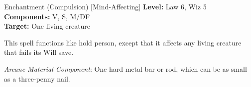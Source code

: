 {Enchantment (Compulsion) [Mind-Affecting]}
{
	\textbf{Level:}
	Law 6, Wiz 5\\
	\textbf{Components:}
	V, S, M/DF\\
	\textbf{Target:}
	One living creature\\
}
{
	This spell functions like hold person, except that it affects any living creature that fails its Will save.

	\textit{Arcane Material Component}:
	One hard metal bar or rod, which can be as small as a three-penny nail.

}
